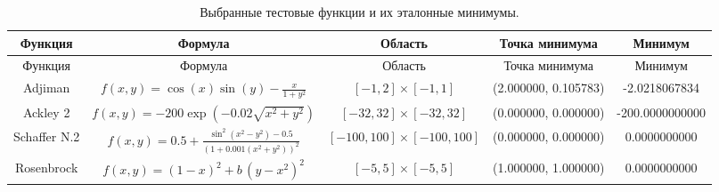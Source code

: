 \begin{longtable}{|c|c|c|c|c|}
\caption{Выбранные тестовые функции и их эталонные минимумы.}\label{tab:analytical}\\
\hline
Функция & Формула & Область & Точка минимума & Минимум \\
\hline
\endfirsthead
\hline
Функция & Формула & Область & Точка минимума & Минимум \\
\hline
\endhead
Adjiman & $f(x, y) = \cos(x)\sin(y) - \frac{x}{1 + y^2}$ & $[-1, 2] \times [-1, 1]$ & (2.000000, 0.105783) & -2.0218067834 \\
Ackley 2 & $f(x, y) = -200 \exp \left(-0.02 \sqrt{x^2 + y^2}\right)$ & $[-32, 32] \times [-32, 32]$ & (0.000000, 0.000000) & -200.0000000000 \\
Schaffer N.2 & $f(x, y) = 0.5 + \frac{\sin^2(x^2 - y^2) - 0.5}{(1 + 0.001(x^2 + y^2))^2}$ & $[-100, 100] \times [-100, 100]$ & (0.000000, 0.000000) & 0.0000000000 \\
Rosenbrock & $f(x, y) = (1 - x)^2 + b\,(y - x^2)^2$ & $[-5, 5] \times [-5, 5]$ & (1.000000, 1.000000) & 0.0000000000 \\
\hline
\end{longtable}
